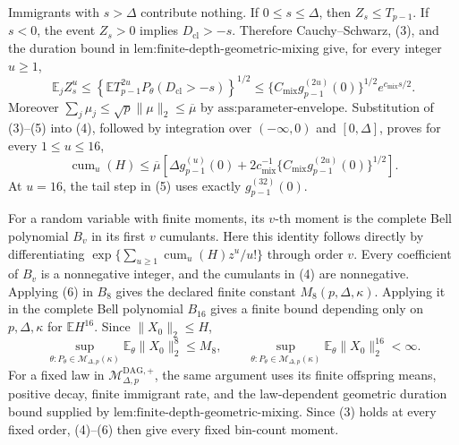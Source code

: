 Immigrants with \(s>\Delta\) contribute nothing.  If \(0\leq s\leq\Delta\), then \(Z_s\leq T_{p-1}\).  If \(s<0\), the event \(Z_s>0\) implies \(D_{\mathrm{cl}}>-s\).  Therefore Cauchy--Schwarz, (3), and the duration bound in \(\text{lem:finite-depth-geometric-mixing}\) give, for every integer \(u\geq1\),
\[
 \mathbb E_j Z_s^u
 \leq
 \left\{\mathbb E T_{p-1}^{2u}
 P_{\theta}(D_{\mathrm{cl}}>-s)\right\}^{1/2}
 \leq
 \{C_{\mathrm{mix}}g_{p-1}^{(2u)}(0)\}^{1/2}
 e^{c_{\mathrm{mix}}s/2}.
\tag{5}
\]
Moreover \(\sum_j\mu_j\leq\sqrt p\lVert\mu\rVert_2\leq\overline\mu\) by \(\text{ass:parameter-envelope}\).  Substitution of (3)--(5) into (4), followed by integration over \(( -\infty,0)\) and \([0,\Delta]\), proves for every \(1\leq u\leq16\),
\[
 \operatorname{cum}_u(H)
 \leq\overline\mu\left[
 \Delta g_{p-1}^{(u)}(0)
 +2c_{\mathrm{mix}}^{-1}
 \{C_{\mathrm{mix}}g_{p-1}^{(2u)}(0)\}^{1/2}
 \right].
\tag{6}
\]
At \(u=16\), the tail step in (5) uses exactly \(g_{p-1}^{(32)}(0)\).

For a random variable with finite moments, its \(v\)-th moment is the complete Bell polynomial \(B_v\) in its first \(v\) cumulants.  Here this identity follows directly by differentiating \(\exp\{\sum_{u\geq1}\operatorname{cum}_u(H)z^u/u!\}\) through order \(v\).  Every coefficient of \(B_v\) is a nonnegative integer, and the cumulants in (4) are nonnegative.  Applying (6) in \(B_8\) gives the declared finite constant \(M_8(p,\Delta,\kappa)\).  Applying it in the complete Bell polynomial \(B_{16}\) gives a finite bound depending only on \(p,\Delta,\kappa\) for \(\mathbb E H^{16}\).  Since \(\lVert X_0\rVert_2\leq H\),
\[
 \sup_{\theta:P_\theta\in\mathcal M_{\Delta,p}(\kappa)}
 \mathbb E_\theta\lVert X_0\rVert_2^8\leq M_8,
 \qquad
 \sup_{\theta:P_\theta\in\mathcal M_{\Delta,p}(\kappa)}
 \mathbb E_\theta\lVert X_0\rVert_2^{16}<\infty.
\tag{7}
\]
For a fixed law in \(\mathcal M_{\Delta,p}^{\mathrm{DAG},+}\), the same argument uses its finite offspring means, positive decay, finite immigrant rate, and the law-dependent geometric duration bound supplied by \(\text{lem:finite-depth-geometric-mixing}\).  Since (3) holds at every fixed order, (4)--(6) then give every fixed bin-count moment.